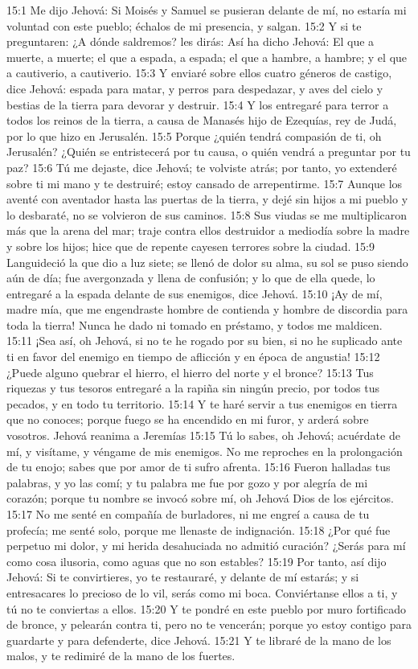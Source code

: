 15:1 Me dijo Jehová: Si Moisés y Samuel se pusieran delante de mí, no estaría mi voluntad con este pueblo; échalos de mi presencia, y salgan. 
15:2 Y si te preguntaren: ¿A dónde saldremos? les dirás: Así ha dicho Jehová: El que a muerte, a muerte; el que a espada, a espada; el que a hambre, a hambre; y el que a cautiverio, a cautiverio. 
15:3 Y enviaré sobre ellos cuatro géneros de castigo, dice Jehová: espada para matar, y perros para despedazar, y aves del cielo y bestias de la tierra para devorar y destruir. 
15:4 Y los entregaré para terror a todos los reinos de la tierra, a causa de Manasés hijo de Ezequías, rey de Judá, por lo que hizo en Jerusalén. 
15:5 Porque ¿quién tendrá compasión de ti, oh Jerusalén? ¿Quién se entristecerá por tu causa, o quién vendrá a preguntar por tu paz? 
15:6 Tú me dejaste, dice Jehová; te volviste atrás; por tanto, yo extenderé sobre ti mi mano y te destruiré; estoy cansado de arrepentirme. 
15:7 Aunque los aventé con aventador hasta las puertas de la tierra, y dejé sin hijos a mi pueblo y lo desbaraté, no se volvieron de sus caminos. 
15:8 Sus viudas se me multiplicaron más que la arena del mar; traje contra ellos destruidor a mediodía sobre la madre y sobre los hijos; hice que de repente cayesen terrores sobre la ciudad. 
15:9 Languideció la que dio a luz siete; se llenó de dolor su alma, su sol se puso siendo aún de día; fue avergonzada y llena de confusión; y lo que de ella quede, lo entregaré a la espada delante de sus enemigos, dice Jehová. 
15:10 ¡Ay de mí, madre mía, que me engendraste hombre de contienda y hombre de discordia para toda la tierra! Nunca he dado ni tomado en préstamo, y todos me maldicen. 
15:11 ¡Sea así, oh Jehová, si no te he rogado por su bien, si no he suplicado ante ti en favor del enemigo en tiempo de aflicción y en época de angustia! 
15:12 ¿Puede alguno quebrar el hierro, el hierro del norte y el bronce? 
15:13 Tus riquezas y tus tesoros entregaré a la rapiña sin ningún precio, por todos tus pecados, y en todo tu territorio. 
15:14 Y te haré servir a tus enemigos en tierra que no conoces; porque fuego se ha encendido en mi furor, y arderá sobre vosotros. 
Jehová reanima a Jeremías 
15:15 Tú lo sabes, oh Jehová; acuérdate de mí, y visítame, y véngame de mis enemigos. No me reproches en la prolongación de tu enojo; sabes que por amor de ti sufro afrenta. 
15:16 Fueron halladas tus palabras, y yo las comí; y tu palabra me fue por gozo y por alegría de mi corazón; porque tu nombre se invocó sobre mí, oh Jehová Dios de los ejércitos. 
15:17 No me senté en compañía de burladores, ni me engreí a causa de tu profecía; me senté solo, porque me llenaste de indignación. 
15:18 ¿Por qué fue perpetuo mi dolor, y mi herida desahuciada no admitió curación? ¿Serás para mí como cosa ilusoria, como aguas que no son estables? 
15:19 Por tanto, así dijo Jehová: Si te convirtieres, yo te restauraré, y delante de mí estarás; y si entresacares lo precioso de lo vil, serás como mi boca. Conviértanse ellos a ti, y tú no te conviertas a ellos. 
15:20 Y te pondré en este pueblo por muro fortificado de bronce, y pelearán contra ti, pero no te vencerán; porque yo estoy contigo para guardarte y para defenderte, dice Jehová. 
15:21 Y te libraré de la mano de los malos, y te redimiré de la mano de los fuertes. 

